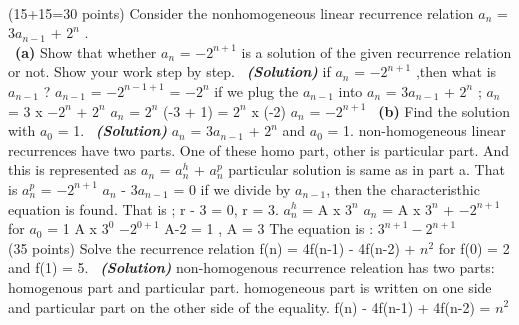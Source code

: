 \documentclass[a4 paper]{article}
\numberwithin{equation}{section}
\newcommand{\problem}[2]{~\\\fbox{\textbf{Problem #1}}\hfill (#2 points)\newline\newline}
\newcommand{\subproblem}[1]{~\newline\textbf{(#1)}}
\newcommand{\solution}{~\newline\textbf{\textit{(Solution)}} }
\newcommand{\0}{\mathbf{0}}
\begin{document}
\problem{1}{15+15=30}
Consider the nonhomogeneous linear recurrence relation $a_n$ = 3$a_{n-1}$ + $2^n$ .\\
\subproblem{a} Show that whether $a_n$ = $-2^{n+1}$ is a solution of the given recurrence relation or not. Show your work step by step.
\solution
\newline
\newline
if $a_n$ = $-2^{n+1}$ ,then what is $a_{n-1}$ ?
\newline
$a_{n-1}$ = $-2^{n-1+1}$ = $-2^n$
\newline
if we plug the $a_{n-1}$ into $a_n$ = 3$a_{n-1}$ + $2^n$ ;
\newline
$a_n$ = 3 x $-2^n$ + $2^n$
\newline
$a_n$ = $2^n$ (-3 + 1) = $2^n$ x (-2)
\newline
$a_n$ = $-2^{n+1}$
\newpage
\subproblem{b} Find the solution with $a_0$ = 1.
\solution
\newline
$a_n$ = 3$a_{n-1}$ + $2^n$  and $a_0$ = 1.
\newline
non-homogeneous linear recurrences have two parts. One of these homo part, other is particular part.
And this is represented as $a_n$ = $a_n^h$ + $a_n^p$
\newline
particular solution is same as in part a.
That is $a_n^p$ =  $-2^{n+1}$
\newline
$a_n$ - 3$a_{n-1}$ = 0
\newline
if we divide by $a_{n-1}$, then the characteristhic equation is found.
That is ;
\newline
r - 3 = 0,  r = 3.
\newline
$a_n^h$ = A x $3^n$
\newline
$a_n$ = A x $3^n$ + $-2^{n+1}$
\newline
for $a_0$ = 1
\newline
A x $3^0$ $-2^{0+1}$
\newline
A-2 = 1 , A = 3
\newline
The equation is :  $3^{n+1} - 2^{n+1}$
\newline
\problem{2}{35}
Solve the recurrence relation f(n) = 4f(n-1) - 4f(n-2) + $n^2$ for f(0) = 2 and f(1) = 5. 
\solution
\newline
non-homogenous recurrence releation has two parts: homogenous part and particular part.
\newline
\newline
homogeneous part is written on one side and particular part on the other side of the equality.
\newline
f(n) - 4f(n-1) + 4f(n-2) = $n^2$
\end{document}
